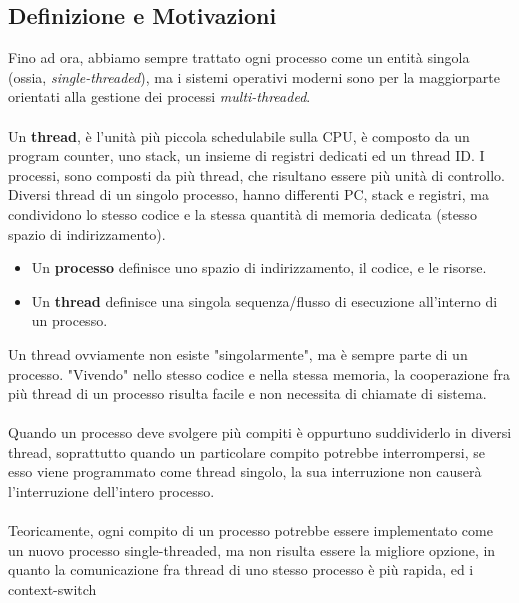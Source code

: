 \documentclass[12pt, letterpaper]{article}
\newcommand{\acc}{\\\hphantom{}\\}
\begin{document}
\subsection{Definizione e Motivazioni}
Fino ad ora, abbiamo sempre trattato ogni processo come un entità singola (ossia, \textit{single-threaded}), ma 
i sistemi operativi moderni sono per la maggiorparte orientati alla gestione dei processi \textit{multi-threaded}.\acc 
Un \textbf{thread}, è l'unità più piccola schedulabile sulla CPU, è composto da un program counter, uno stack, un insieme 
di registri dedicati ed un thread ID. I processi, sono composti da più thread, che risultano essere più unità di controllo.
Diversi thread di un singolo processo, hanno differenti PC, stack e registri, ma condividono lo stesso codice e la 
stessa quantità di memoria dedicata (stesso spazio di indirizzamento). \begin{itemize}
    \item Un \textbf{processo} definisce uno spazio di indirizzamento, il codice, e le risorse.
    \item Un \textbf{thread} definisce una singola sequenza/flusso di esecuzione all'interno di un processo.
\end{itemize}
\begin{figure}[h]
\end{figure}Un thread ovviamente non esiste "singolarmente", ma è sempre parte di un processo. "Vivendo" nello stesso codice e 
nella stessa memoria, la cooperazione fra più thread di un processo risulta facile e non necessita di chiamate di sistema.\acc 
Quando un processo deve svolgere più compiti è oppurtuno suddividerlo in diversi thread, soprattutto quando un particolare 
compito potrebbe interrompersi, se esso viene programmato come thread singolo, la sua interruzione non causerà 
l'interruzione dell'intero processo.\acc 
Teoricamente, ogni compito di un processo potrebbe essere implementato come un nuovo processo single-threaded, ma non 
risulta essere la migliore opzione, in quanto la comunicazione fra thread di uno stesso processo è più rapida, ed i context-switch 
\end{document}
